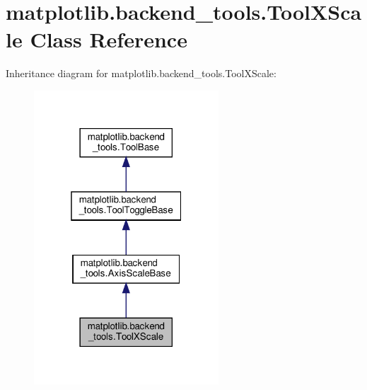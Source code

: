 \hypertarget{classmatplotlib_1_1backend__tools_1_1ToolXScale}{}\section{matplotlib.\+backend\+\_\+tools.\+Tool\+X\+Scale Class Reference}
\label{classmatplotlib_1_1backend__tools_1_1ToolXScale}


Inheritance diagram for matplotlib.\+backend\+\_\+tools.\+Tool\+X\+Scale\+:
\nopagebreak
\begin{figure}[H]
\begin{center}
\leavevmode
\includegraphics[width=196pt]{classmatplotlib_1_1backend__tools_1_1ToolXScale__inherit__graph}
\end{center}
\end{figure}


